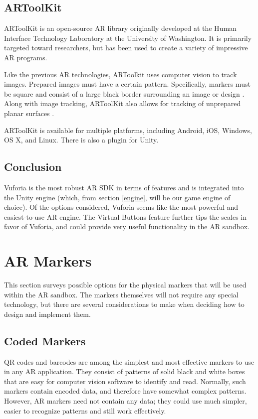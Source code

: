 \documentclass[letterpaper, 10pt, onecolumn, draftclsnofoot]{IEEEtran}
\begin{document}
\subsection{ARToolKit}
ARToolKit is an open-source AR library originally developed at the Human Interface Technology Laboratory at the University of Washington. It is primarily targeted toward researchers, but has been used to create a variety of impressive AR programs.

Like the previous AR technologies, ARToolkit uses computer vision to track images. Prepared images must have a certain pattern. Specifically, markers must be square and consist of a large black border surrounding an image or design \cite{artoolkit-docs}. Along with image tracking, ARToolKit also allows for tracking of unprepared planar surfaces \cite{artoolkit-features}.

ARToolKit is available for multiple platforms, including Android, iOS, Windows, OS X, and Linux. There is also a plugin for Unity.

\subsection{Conclusion}
Vuforia is the most robust AR SDK in terms of features and is integrated into the Unity engine (which, from section \ref{engine}, will be our game engine of choice). Of the options considered, Vuforia seems like the most powerful and easiest-to-use AR engine. The Virtual Buttons feature further tips the scales in favor of Vuforia, and could provide very useful functionality in the AR sandbox.

\section{AR Markers}
This section surveys possible options for the physical markers that will be used within the AR sandbox. The markers themselves will not require any special technology, but there are several considerations to make when deciding how to design and implement them.

\subsection{Coded Markers}
QR codes and barcodes are among the simplest and most effective markers to use in any AR application. They consist of patterns of solid black and white boxes that are easy for computer vision software to identify and read. Normally, such markers contain encoded data, and therefore have somewhat complex patterns. However, AR markers need not contain any data; they could use much simpler, easier to recognize patterns and still work effectively.
\end{document}
